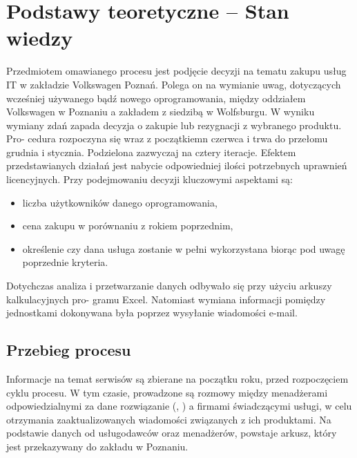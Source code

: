 
\chapter{Podstawy teoretyczne -- Stan wiedzy}

Przedmiotem omawianego procesu jest podjęcie decyzji na tematu zakupu usług IT w zakładzie
Volkswagen Poznań. Polega on na wymianie uwag, dotyczących wcześniej używanego bądź nowego
oprogramowania, między oddziałem Volkswagen w Poznaniu a zakładem z siedzibą w Wolfsburgu.
W wyniku wymiany zdań zapada decyzja o zakupie lub rezygnacji z wybranego produktu. Pro-
cedura rozpoczyna się wraz z początkiemn czerwca i trwa do przełomu grudnia i stycznia. Podzielona zazwyczaj na cztery iteracje. Efektem
przedstawianych działań jest nabycie odpowiedniej ilości potrzebnych uprawnień licencyjnych. Przy
podejmowaniu decyzji kluczowymi aspektami są:
\begin{itemize}
    \item liczba użytkowników danego oprogramowania,
    \item cena zakupu w porównaniu z rokiem poprzednim,
    \item określenie czy dana usługa zostanie w pełni wykorzystana biorąc pod uwagę poprzednie
kryteria.
\end{itemize}
Dotychczas analiza i przetwarzanie danych odbywało się przy użyciu arkuszy kalkulacyjnych pro-
gramu Excel. Natomiast wymiana informacji pomiędzy jednostkami dokonywana była poprzez
wysyłanie wiadomości e-mail.
\section{Przebieg procesu}
Informacje na temat serwisów są zbierane na początku roku, przed rozpoczęciem cyklu procesu. W tym czasie, prowadzone są rozmowy między menadżerami odpowiedzialnymi za dane rozwiązanie (, ) a firmami świadczącymi usługi, w celu otrzymania zaaktualizowanych wiadomości związanych z ich produktami. Na podstawie danych od usługodawców oraz menadżerów, powstaje arkusz, który jest przekazywany do zakładu w Poznaniu.
